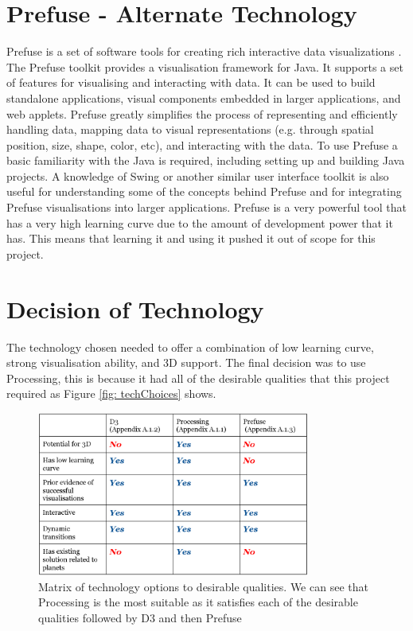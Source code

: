 \section{Prefuse - Alternate Technology}
Prefuse is a set of software tools for creating rich interactive data
visualizations \cite{prefuse}. The
Prefuse toolkit provides a visualisation framework for Java. It supports a set
of features
for visualising and interacting with data. It can be used to build standalone
applications, visual
components embedded
in larger applications, and web applets. Prefuse greatly simplifies the
process
of representing and efficiently handling data, mapping data to visual
representations (e.g.
through spatial position, size, shape, color, etc), and interacting with the
data.
To use Prefuse a basic familiarity with the Java is required, including setting
up and building
Java projects. A knowledge of Swing or another similar user interface toolkit is
also
useful for understanding some of the concepts behind Prefuse and for integrating
Prefuse
visualisations into larger applications. Prefuse is a very powerful tool that
has a very high learning curve due
to the amount of development power that it has. This means that learning it and
using it pushed it out of scope for this project.


\section{Decision of Technology}

The technology chosen needed to offer a combination of low learning curve,
strong visualisation ability, and 3D support.
The final decision was to use Processing, this is because it had all
of the desirable qualities that this project required as Figure \ref{fig:
techChoices} shows. 

\begin{figure}[H]
  \centering
      \includegraphics[width=0.8\textwidth]{images/table_technologies.jpg}
  \caption[Matrix of technology options to desirable qualities]{Matrix of technology options to desirable qualities. We can see that Processing is the most suitable as it satisfies each of the desirable qualities followed by D3 and then Prefuse}
  \label{fig: techChoices}
\end{figure}

